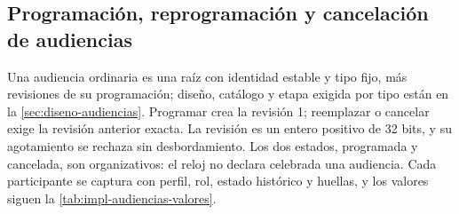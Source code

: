 \subsection{Programación, reprogramación y cancelación de audiencias}\label{sec:impl-audiencias}

Una audiencia ordinaria es una raíz con identidad estable y tipo fijo, más revisiones de su programación; diseño, catálogo y etapa exigida por tipo están en la \cref{sec:diseno-audiencias}. Programar crea la revisión 1; reemplazar o cancelar exige la revisión anterior exacta. La revisión es un entero positivo de 32 bits, y su agotamiento se rechaza sin desbordamiento. Los dos estados, programada y cancelada, son organizativos: el reloj no declara celebrada una audiencia. Cada participante se captura con perfil, rol, estado histórico y huellas, y los valores siguen la \cref{tab:impl-audiencias-valores}.

